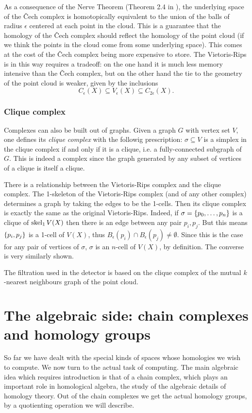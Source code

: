 \documentclass[../main.tex]{subfiles}
\begin{document}
As a consequence of the Nerve Theorem (Theorem 2.4 in \cite{ghrist}), the underlying space
of the Čech complex is homotopically equivalent to the union of the balls of radius \(
\epsilon \) centered at each point in the cloud. This is a guarantee that the homology of
the Čech complex should reflect the homology of the point cloud (if we think the points in
the cloud come from some underlying space). This comes at the cost of the Čech complex
being more expensive to store. The Vietoris-Rips is in this way requires a tradeoff: on
the one hand it is much less memory intensive than the Čech complex, but on the other hand
the tie to the geometry of the point cloud is weaker, given by the inclusions
\begin{equation*}
	C_\epsilon(X) \subseteq V_\epsilon(X) \subseteq C_{2\epsilon}(X). 
\end{equation*}


\subsubsection{Clique complex} \label{sec:clique complex}
Complexes can also be built out of graphs. Given a graph \( G \) with vertex set \( V \),
one defines its \emph{clique complex} with the followig prescription: \( \sigma
\subseteq V \) is a simplex in the clique complex if and only if it is a clique, i.e. a
fully-connected subgraph of \( G \). This is indeed a complex since the graph generated by
any subset of vertices of a clique is itself a clique.

There is a relationship between the Vietoris-Rips complex and the clique complex. The
1-skeleton of the Vietoris-Rips complex (and of any other complex) determines a graph by
taking the edges to be the 1-cells. Then its clique complex is exactly the same as the
original Vietoris-Rips. Indeed, if \( \sigma = \left\{ p_0, \dots, p_n \right\} \) is a clique of \(
\operatorname{skel}_1{V(X)} \) then there is an edge between any pair \( p_i, p_j \). But this means
\( \left\{ p_i, p_j \right\} \) is a 1-cell of \( V(X) \), thus \( B_\epsilon(p_i) \cap
B_\epsilon(p_j) \neq \emptyset \). Since this is the case for any pair of vertices of \(
\sigma \), \( \sigma \) is an \( n \)-cell of \( V(X) \), by definition. The converse
is very similarly shown. 

The filtration used in the detector is based on the clique complex of the mutual \( k
\)-nearest neighbours graph of the point cloud. 

\section{The algebraic side: chain complexes and homology groups}\label{sec:algebraic
side}
So far we have dealt with the special kinds of spaces whose homologies we wish to compute.
We now turn to the actual task of computing. The main algebraic idea which requires
introduction is that of a chain complex, which plays an important role in homological
algebra, the study of the algebraic details of homology theory. Out of the chain
complexes we get the actual homology groups, by a quotienting operation we will describe.
\end{document}
